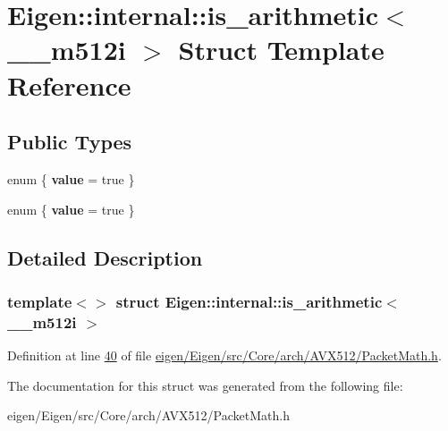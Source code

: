 \hypertarget{struct_eigen_1_1internal_1_1is__arithmetic_3_01____m512i_01_4}{}\section{Eigen\+:\+:internal\+:\+:is\+\_\+arithmetic$<$ \+\_\+\+\_\+m512i $>$ Struct Template Reference}
\label{struct_eigen_1_1internal_1_1is__arithmetic_3_01____m512i_01_4}
\subsection*{Public Types}
\begin{DoxyCompactItemize}
\item 
\mbox{\label{struct_eigen_1_1internal_1_1is__arithmetic_3_01____m512i_01_4_acbb739691ae89a3cf0e10bf1088caee0}} 
enum \{ {\bfseries value} = true
 \}
\item 
\mbox{\label{struct_eigen_1_1internal_1_1is__arithmetic_3_01____m512i_01_4_a3c44e16576dc997a321a9c2b4121af5a}} 
enum \{ {\bfseries value} = true
 \}
\end{DoxyCompactItemize}


\subsection{Detailed Description}
\subsubsection*{template$<$$>$\newline
struct Eigen\+::internal\+::is\+\_\+arithmetic$<$ \+\_\+\+\_\+m512i $>$}



Definition at line \hyperlink{eigen_2_eigen_2src_2_core_2arch_2_a_v_x512_2_packet_math_8h_source_l00040}{40} of file \hyperlink{eigen_2_eigen_2src_2_core_2arch_2_a_v_x512_2_packet_math_8h_source}{eigen/\+Eigen/src/\+Core/arch/\+A\+V\+X512/\+Packet\+Math.\+h}.



The documentation for this struct was generated from the following file\+:\begin{DoxyCompactItemize}
\item 
eigen/\+Eigen/src/\+Core/arch/\+A\+V\+X512/\+Packet\+Math.\+h\end{DoxyCompactItemize}
